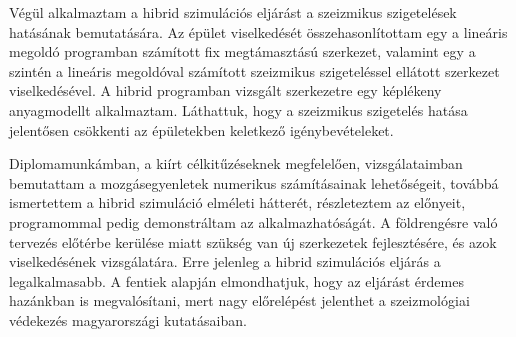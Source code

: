 Végül alkalmaztam a hibrid szimulációs eljárást a szeizmikus szigetelések hatásának bemutatására. Az épület viselkedését összehasonlítottam egy a lineáris megoldó programban számított fix megtámasztású szerkezet, valamint egy a szintén a lineáris megoldóval számított szeizmikus szigeteléssel ellátott szerkezet viselkedésével. A hibrid programban vizsgált szerkezetre egy képlékeny anyagmodellt alkalmaztam. Láthattuk, hogy a szeizmikus szigetelés hatása jelentősen csökkenti az épületekben keletkező igénybevételeket.

Diplomamunkámban, a kiírt célkitűzéseknek megfelelően, vizsgálataimban bemutattam a mozgásegyenletek numerikus számításainak lehetőségeit, továbbá ismertettem a hibrid szimuláció elméleti hátterét, részleteztem az előnyeit, programommal pedig demonstráltam az alkalmazhatóságát. A földrengésre való tervezés előtérbe kerülése miatt szükség van új szerkezetek fejlesztésére, és azok viselkedésének vizsgálatára. Erre jelenleg a hibrid szimulációs eljárás a legalkalmasabb. A fentiek alapján elmondhatjuk, hogy az eljárást érdemes  hazánkban is megvalósítani, mert nagy előrelépést jelenthet a szeizmológiai védekezés  magyarországi kutatásaiban. 